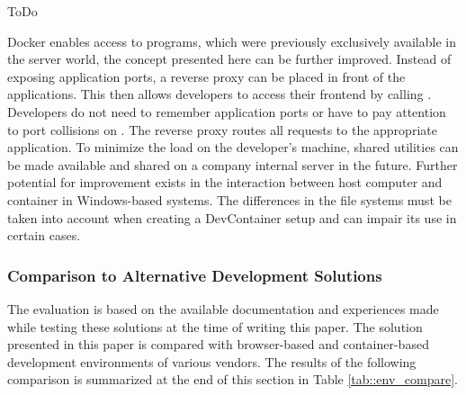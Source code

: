         ToDo

        Docker enables access to programs, which were previously exclusively available in the server world, the concept presented here can be further improved. Instead of exposing application ports, a reverse proxy can be placed in front of the applications. This then allows developers to access their frontend by calling . Developers do not need to remember application ports or have to pay attention to port collisions on . The reverse proxy routes all requests to the appropriate application. To minimize the load on the developer's machine, shared utilities can be made available and shared on a company internal server in the future. Further potential for improvement exists in the interaction between host computer and container in Windows-based systems. The differences in the file systems must be taken into account when creating a DevContainer setup and can impair its use in certain cases.


    \subsubsection{Comparison to Alternative Development Solutions}
    The evaluation is based on the available documentation and experiences made while testing these solutions at the time of writing this paper. The solution presented in this paper is compared with browser-based and container-based development environments of various vendors. The results of the following comparison is summarized at the end of this section in Table \ref{tab::env_compare}.

